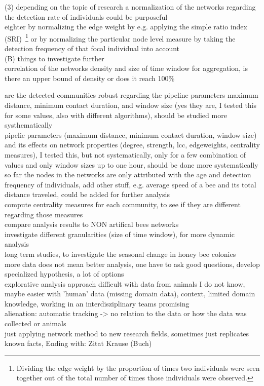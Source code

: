 (3) depending on the topic of research a normalization of the networks regarding the detection rate of individuals could be purposeful\\
eighter by normalizing the edge weight by e.g. applying the simple ratio index (SRI)~\footnote{Dividing the edge weight by the proportion of times two individuals were seen
together out of the total number of times those individuals were observed.} 
or by normalizing the particular node level measure by taking the detection frequency of that focal individual into account\\


(B) things to investigate further\\

correlation of the networks density and size of time window for aggregation, is there an upper bound of density or does it reach 100\%

are the detected communities robust regarding the pipeline parameters maximum distance, minimum contact duration, and window size (yes they are, I tested this for some values, also with different algorithms), should be studied more systhematically\\

pipelie parameters (maximum distance, minimum contact duration, window size) and its effects on network properties (degree, strength, lcc, edgeweights, centrality measures), I tested this, but not systematically, only for a few combination of values and only window sizes up to one hour, should be done more systematically\\

so far the nodes in the networks are only attributed with the age and detection frequency of individuals, add other stuff, e.g. average speed of a bee and its total distance traveled, could be added for further analysis\\

compute centrality measures for each community, to see if they are different regarding those measures\\

compare analysis results to NON artifical bees networks\\

investigate different granularities (size of time window), for more dynamic analysis\\

long term studies, to investigate the seasonal change in honey bee colonies\\



\vspace{2cm}
more data does not mean better analysis, one have to ask good questions, develop specialized hypothesis, a lot of options\\
explorative analysis approach difficult with data from animals I do not know, maybe easier with 'human' data (missing domain data), context, limited domain knowledge, working in an interdisziplinary teams promising\\
alienation: automatic tracking -> no relation to the data or how the data was collected or animals\\
just applying network method to new research fields, sometimes just replicates known facts, Ending with: Zitat Krause (Buch)